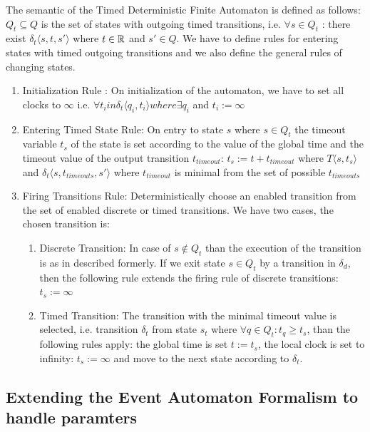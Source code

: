 			The semantic of the Timed Deterministic Finite Automaton is defined as follows:
			$Q_t \subseteq Q$ is the set of states with outgoing timed transitions, i.e. $\forall s \in Q_t$ : there exist $ \delta_t\langle s, t, s' \rangle$ where $t \in \mathbb{R}$ and $s' \in Q$.
			We have to define rules for entering states with timed outgoing transitions and we also define the general rules of changing states. 
			\begin{enumerate}
				\item Initialization Rule : On initialization of the automaton, we have to set all clocks to $\infty$ i.e. $\forall t_i in \delta_t \langle q_i, t_i \rangle where \exists q_i$ and $t_i := \infty $
			
				\item Entering Timed State Rule: On entry to state $s$ where $s \in Q_t$ the timeout variable $t_s$ of the state is set according to the value of the global time and the timeout value of the output transition $t_{timeout}$:
					$t_s:= t+t_{timeout}$ %
					where $T\langle s,t_s \rangle$ and $\delta_t\langle s,t_{timeouts},s' \rangle$ where $t_{timeout}$ is minimal from the set of possible $t_{timeouts}$ 
				
				\item Firing Transitions Rule: Deterministically choose an enabled transition from the set of enabled discrete or timed transitions. We have two cases, the chosen transition is:
					\begin{enumerate}
						\item Discrete Transition: In case of $s \notin Q_t$ than the execution of the transition is as in described formerly. If we exit state $s \in Q_t$ by a transition in $\delta_d$, 
						then the following rule extends the firing rule of discrete transitions:
							$t_s := \infty$
						\item Timed Transition: The transition with the minimal timeout value is selected, i.e. transition $\delta_t$ from state $s_t$ where $\forall q \in Q_t: t_q \geq t_s$, than the following rules apply:
						 the global time is set $t := t_s$, the local clock is set to infinity: $t_s := \infty$ and move to the next state according to $\delta_t$.
					\end{enumerate}			
			\end{enumerate}
			
		\subsection{Extending the Event Automaton Formalism to handle paramters}
			
